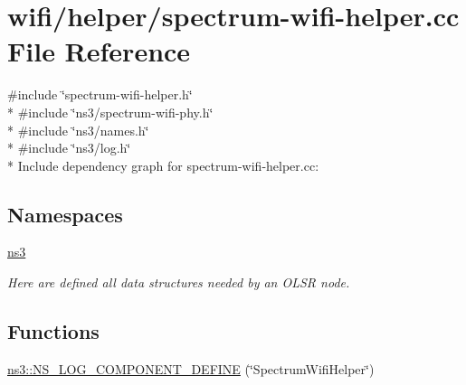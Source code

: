 \hypertarget{spectrum-wifi-helper_8cc}{}\section{wifi/helper/spectrum-\/wifi-\/helper.cc File Reference}
\label{spectrum-wifi-helper_8cc}
{\ttfamily \#include \char`\"{}spectrum-\/wifi-\/helper.\+h\char`\"{}}\\*
{\ttfamily \#include \char`\"{}ns3/spectrum-\/wifi-\/phy.\+h\char`\"{}}\\*
{\ttfamily \#include \char`\"{}ns3/names.\+h\char`\"{}}\\*
{\ttfamily \#include \char`\"{}ns3/log.\+h\char`\"{}}\\*
Include dependency graph for spectrum-\/wifi-\/helper.cc\+:
\subsection*{Namespaces}
\begin{DoxyCompactItemize}
\item 
 \hyperlink{namespacens3}{ns3}
\begin{DoxyCompactList}\small\item\em Here are defined all data structures needed by an O\+L\+SR node. \end{DoxyCompactList}\end{DoxyCompactItemize}
\subsection*{Functions}
\begin{DoxyCompactItemize}
\item 
\hyperlink{namespacens3_a2803570cc577ebbc42d49281243b8d4e}{ns3\+::\+N\+S\+\_\+\+L\+O\+G\+\_\+\+C\+O\+M\+P\+O\+N\+E\+N\+T\+\_\+\+D\+E\+F\+I\+NE} (\char`\"{}Spectrum\+Wifi\+Helper\char`\"{})
\end{DoxyCompactItemize}
